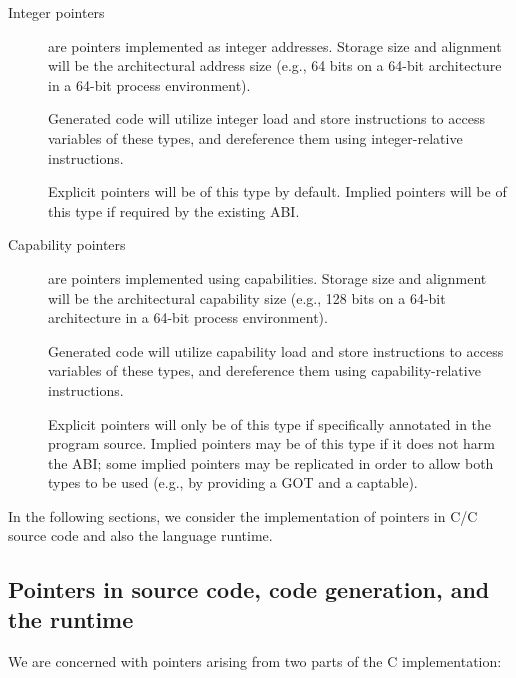 \documentclass[12pt,twoside,openright,a4paper]{article}
\newcommand{\note}[2]{{\color{blue}[ Note: #1 - #2]}}
\renewcommand{\note}[2]{\relax\ifhmode\unskip\fi}
\newcommand{\psnote}[1]{\note{#1}{Peter S.}}
\newcommand{\dcnote}[1]{\note{#1}{David}}
\newcommand*{\cpp}{\texorpdfstring{C\textsmaller[2]{\protect\nolinebreak[4]\hspace{-.05em}\raisebox{.45ex}{\textbf{++}}}}{C++}}
\begin{document}
\begin{description}
\item[Integer pointers] are pointers implemented as integer addresses.
  Storage size and alignment will be the architectural address size (e.g.,
  64 bits on a 64-bit architecture in a 64-bit process environment).

  Generated code will utilize integer load and store instructions to access
  variables of these types, and dereference them using integer-relative
  instructions.

  Explicit pointers will be of this type by default.
  Implied pointers will be of this type if required by the existing ABI.

\item[Capability pointers] are pointers implemented using capabilities.
  Storage size and alignment will be the architectural capability size (e.g.,
  128 bits on a 64-bit architecture in a 64-bit process environment\psnote{, with the tag bit for eachcapability-sized-and-aligned unit of memory maintained by the hardware in non-addressable memory}).

  Generated code will utilize capability load and store instructions to access
  variables of these types, and dereference them using capability-relative
  instructions.

  Explicit pointers will only be of this type if specifically annotated in the
  program source.
  Implied pointers may be of this type if it does not harm the ABI; some
  implied pointers may be replicated in order to allow both types to be used
  (e.g., by providing a GOT and a captable).
\end{description}

In the following sections, we consider the implementation of pointers in
C/\cpp{} source code and also the language runtime.

\subsection{Pointers in source code, code generation, and the runtime}

\dcnote{This definition would benefit from being much earlier.  The doc
currently talks about implied pointers a lot before it ever defines them and
the definition is obvious only to someone who has spent a nontrivial amount of
time hacking on a C/C++ runtime.}
We are concerned with pointers arising from two parts of the C implementation:
\end{document}
